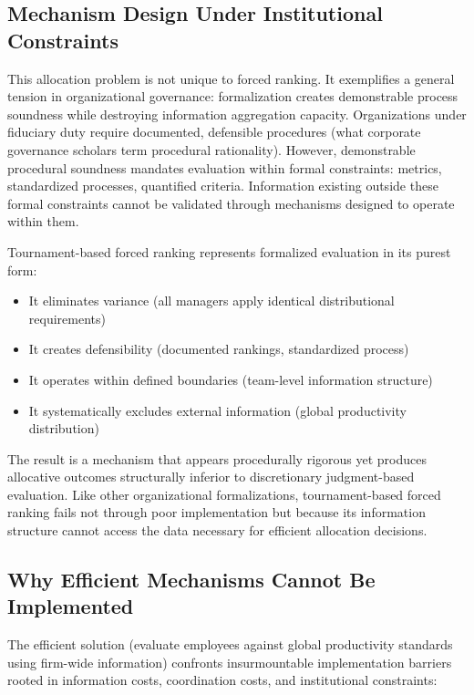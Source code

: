 \documentclass[12pt]{article}
\begin{document}
\subsection{Mechanism Design Under Institutional Constraints}

This allocation problem is not unique to forced ranking. It exemplifies a general tension in organizational governance: formalization creates demonstrable process soundness while destroying information aggregation capacity. Organizations under fiduciary duty require documented, defensible procedures (what corporate governance scholars term procedural rationality). However, demonstrable procedural soundness mandates evaluation within formal constraints: metrics, standardized processes, quantified criteria. Information existing outside these formal constraints cannot be validated through mechanisms designed to operate within them.

Tournament-based forced ranking represents formalized evaluation in its purest form:

\begin{itemize}
\item It eliminates variance (all managers apply identical distributional requirements)
\item It creates defensibility (documented rankings, standardized process)
\item It operates within defined boundaries (team-level information structure)
\item It systematically excludes external information (global productivity distribution)
\end{itemize}

The result is a mechanism that appears procedurally rigorous yet produces allocative outcomes structurally inferior to discretionary judgment-based evaluation. Like other organizational formalizations, tournament-based forced ranking fails not through poor implementation but because its information structure cannot access the data necessary for efficient allocation decisions.

\subsection{Why Efficient Mechanisms Cannot Be Implemented}

The efficient solution (evaluate employees against global productivity standards using firm-wide information) confronts insurmountable implementation barriers rooted in information costs, coordination costs, and institutional constraints:
\end{document}
